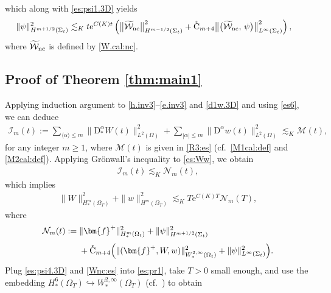 \documentclass[twoside,11pt]{article}
\numberwithin{equation}{section}
\begin{document}
which along with \eqref{es:psi1.3D} yields
\begin{align}
	\|\psi\|_{H^{m+1/2}(\Sigma_{t})}^2
	&\lesssim_K  t\mathrm{e}^{C(K)t}
	\left(\big\| \widetilde{\mathcal{W}}_{\rm nc} \big\|_{H^{m-1/2}(\Sigma_{t})}^2+
	\mathring{\rm C}_{m+4}  \big\|\big(\widetilde{\mathcal{W}}_{\rm nc},\, \psi\big)\big\|_{L^{\infty}(\Sigma_{t})}^2\right),
	\label{es:psi4.3D}
\end{align}
where $\widetilde{\mathcal{W}}_{\rm nc}$ is defined by \eqref{W.cal:nc}.






	\subsection{Proof of Theorem \ref{thm:main1}} \label{sec.Thm2.2}
	Applying induction argument to
\eqref{h.inv3}--\eqref{e.inv3} and \eqref{d1w.3D} and using \eqref{es6}, we can deduce
\begin{align}\label{es:Ww}
	\mathcal{I}_m(t):=\sum_{\langle \alpha\rangle \leq m}	\| \mathrm{D}_*^{\alpha}W (t)\|_{L^2(\Omega)}^2
	+\sum_{|\alpha| \leq m}	\|  \mathrm{D}^{\alpha}w(t)\|_{ L^2(\Omega)}^2
	\lesssim_K  \mathcal{M}(t),
\end{align}
for any integer $m\geq 1$, where $\mathcal{M}(t)$ is given in \eqref{R3:es} (cf.~\eqref{M1cal:def} and \eqref{M2cal:def}).
Applying Gr\"{o}nwall's inequality to \eqref{es:Ww}, we obtain
\begin{align} \nonumber
	 \mathcal{I}_m(t) \lesssim_K \mathcal{N}_m(t),
\end{align}
which implies
\begin{align}
\label{es:pr1}
	\|W\|_{H_*^m(\Omega_{T})}^2	+	\|w\|_{H^m(\Omega_{T})}^2
	\lesssim_K
	T\mathrm{e}^{C(K)T}\mathcal{N}_m(T),
\end{align}
where %
\begin{align}\nonumber
	\mathcal{N}_m(t)
	:=	\;&
	{\|} \bm{f}^+ {\|}_{H_*^m(\Omega_{t})}^2+\|\psi\|_{H^{m+1/2}(\Sigma_{t})}^2\\[1mm]
	&\nonumber	+\mathring{\rm C}_{m+4}  \Big(\|(\bm{f}^+,W,w)\|_{W_*^{2,\infty}(\Omega_{t})}^2+\|\psi\|_{L^{\infty}(\Sigma_{t})}^2\Big)
.
\end{align}	
Plug \eqref{es:psi4.3D}%
and \eqref{Wnc:es} into \eqref{es:pr1}, take $T>0$ small enough, and
use the embedding $H_*^6(\Omega_{T})\hookrightarrow W_*^{2,\infty}(\Omega_{T})$ (cf.~\cite[Lemma 3.3]{TW21MR4201624}) to obtain
\end{document}
